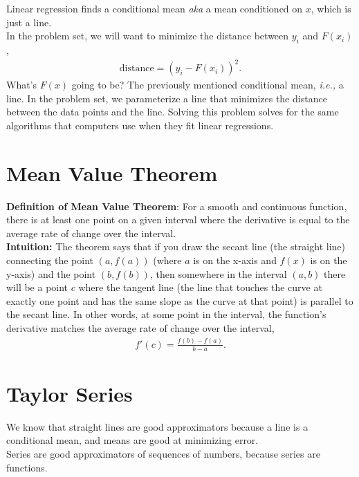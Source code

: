 \documentclass{article}
\begin{document}
Linear regression finds a conditional mean \textit{aka} a mean conditioned on $x$, which is just a line. \\

In the problem set, we will want to minimize the distance between $y_i$ and $F(x_i)$,
\begin{align}
    \text{distance}=(y_i - F(x_i))^2.
\end{align}
What's $F(x)$ going to be? The previously mentioned conditional mean, \textit{i.e.,} a line. In the problem set, we parameterize a line that minimizes the distance between the data points and the line. Solving this problem solves for the same algorithms that computers use when they fit linear regressions. 

\section{Mean Value Theorem}
\textbf{Definition of Mean Value Theorem}: For a smooth and continuous function, there is at least one point on a given interval where the derivative is equal to the average rate of change over the interval. \\

\textbf{Intuition:} The theorem says that if you draw the secant line (the straight line) connecting the point $(a, f(a))$ (where $a$ is on the x-axis and $f(x)$ is on the y-axis) and the point $(b, f(b))$, then somewhere in the interval $(a,b)$ there will be a point $c$ where the tangent line (the line that touches the curve at exactly one point and has the same slope as the curve at that point) is parallel to the secant line. In other words, at some point in the interval, the function's derivative matches the average rate of change over the interval, 
\begin{align}
    f'(c) = \frac{f(b) - f(a)}{b - a}.
\end{align}

\section{Taylor Series}

We know that straight lines are good approximators because a line is a conditional mean, and means are good at minimizing error.\\

Series are good approximators of sequences of numbers, because series are functions. \\
\end{document}
